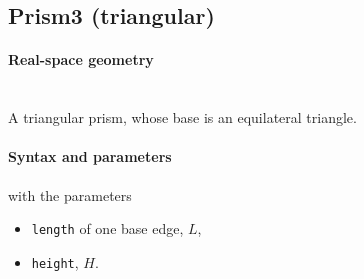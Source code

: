 \clearpage
\subsection{Prism3 (triangular)} \label{sec:Prism3}

\paragraph{Real-space geometry}\strut\\
A triangular prism, whose base is an equilateral
triangle.

\begin{figure}[h]
\hfill
{}
\hfill
{}
\hfill
{}
\hfill
\end{figure}

\FloatBarrier

\paragraph{Syntax and parameters}
\begin{quote}
\end{quote}
with the parameters
\begin{itemize}
\item \texttt{length} of one base edge, $L$,
\item \texttt{height}, $H$.
\end{itemize}


